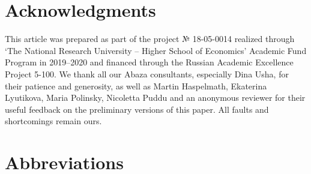 \documentclass[output=paper]{langscibook}
\begin{document}
\section*{Acknowledgments}

This article was prepared as part of the project № 18-05-0014 realized through ‘The National Research University – Higher School of Economics’ Academic Fund Program in 2019–2020 and financed through the Russian Academic Excellence Project 5-100. We thank all our Abaza consultants, especially Dina Usha, for their patience and generosity, as well as Martin Haspelmath, Ekaterina Lyutikova, Maria Polinsky, Nicoletta Puddu and an anonymous reviewer for their useful feedback on the preliminary versions of this paper. All faults and shortcomings remain ours.



\section*{Abbreviations}
\end{document}

